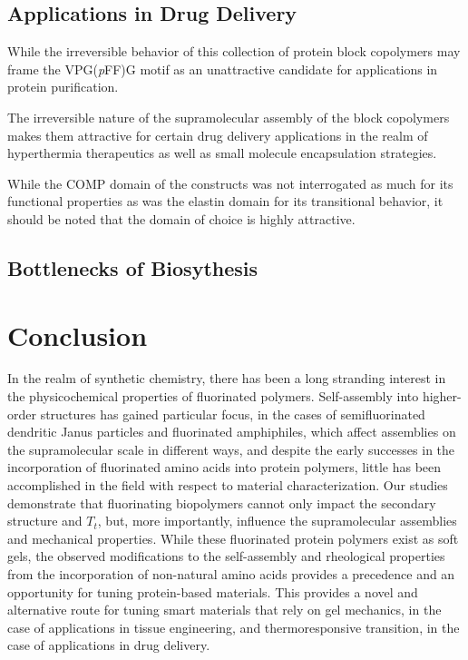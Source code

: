 \begin{refsection}
\subsection{Applications in Drug Delivery}

While the irreversible behavior of this collection of protein block copolymers
may frame the VPG(\emph{p}FF)G motif as an unattractive candidate for applications in protein
purification.

The irreversible nature of the supramolecular assembly of the block copolymers
makes them attractive for certain drug delivery applications in the realm of
hyperthermia therapeutics as well as small molecule encapsulation strategies.

While the COMP domain of the constructs was not interrogated as much for its
functional properties as was the elastin domain for its transitional behavior,
it should be noted that the domain of choice is highly attractive.

\subsection{Bottlenecks of Biosythesis}


\section{Conclusion}

In the realm of synthetic chemistry, there has been a long stranding interest in
the physicochemical properties of fluorinated polymers. Self-assembly into
higher-order structures has gained particular focus, in the cases of
semifluorinated dendritic Janus particles and fluorinated amphiphiles, which
affect assemblies on the supramolecular scale in different ways, and
despite the early successes in the incorporation of fluorinated amino acids into
protein polymers, little has been accomplished in the field with respect to
material characterization. Our studies demonstrate that fluorinating biopolymers
cannot only impact the secondary structure and ${T_t}$, but, more importantly,
influence the supramolecular assemblies and mechanical properties. While these
fluorinated protein polymers exist as soft gels, the observed modifications to
the self-assembly and rheological properties from the incorporation of
non-natural amino acids provides a precedence and an opportunity for tuning
protein-based materials. This provides a novel and alternative route for tuning
smart materials that rely on gel mechanics, in the case of applications in
tissue engineering, and thermoresponsive transition, in the case of applications
in drug delivery. 

\printbibliography[heading=subbibliography]

\end{refsection}
